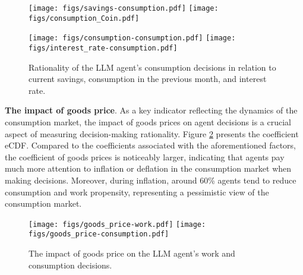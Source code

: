 
\begin{figure}[t]
\centering
\texttt{[image: figs/savings-consumption.pdf]}
\hspace{0.5cm}
\texttt{[image: figs/consumption\_Coin.pdf]}

\texttt{[image: figs/consumption-consumption.pdf]}
\hspace{0.5cm}
\texttt{[image: figs/interest\_rate-consumption.pdf]}
\caption{Rationality of the LLM agent's consumption decisions in relation to current savings, consumption in the previous month, and interest rate.} 
\vspace{-0.2cm}
\label{fig::consumption-decision-rationality}
\end{figure}

\textbf{The impact of goods price}. As a key indicator reflecting the dynamics of the consumption market, the impact of goods prices on agent decisions is a crucial aspect of measuring decision-making rationality. Figure \ref{fig::goods_price} presents the coefficient eCDF. Compared to the coefficients associated with the aforementioned factors, the coefficient of goods prices is noticeably larger, indicating that agents pay much more attention to inflation or deflation in the consumption market when making decisions. Moreover, during inflation, around 60\% agents tend to reduce consumption and work propensity, representing a pessimistic view of the consumption market.


\begin{figure}[t]
\centering
\texttt{[image: figs/goods\_price-work.pdf]}
\texttt{[image: figs/goods\_price-consumption.pdf]}
\caption{The impact of goods price on the LLM agent's work and consumption decisions.} \label{fig::goods_price}
\end{figure}

